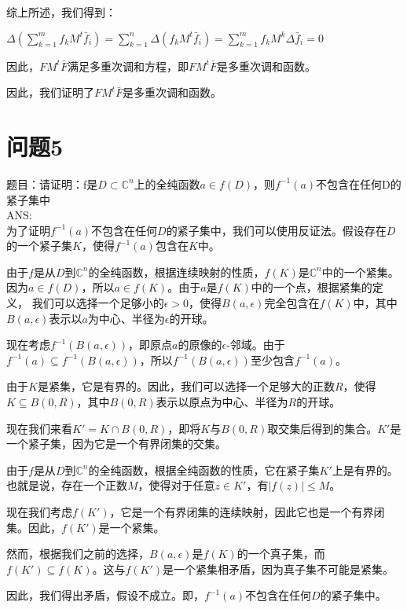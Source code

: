 \documentclass[12pt, a4paper, oneside]{ctexart}
\begin{document}
\begin{spacing}{2.0}
综上所述，我们得到：

\begin{center}
    $\displaystyle \Delta(\sum\limits_{k=1}^{m}f_kM^t\bar{f}_i)=\sum\limits_{k=1}^{n}\Delta(f_kM^t\bar{f}_i)=\sum\limits_{k=1}^{m}f_kM^k\Delta\bar{f}_i=0$
\end{center}

因此，$FM^t\bar{F}$满足多重次调和方程，即$FM^t\bar{F}$是多重次调和函数。

因此，我们证明了$FM^t\bar{F}$是多重次调和函数。


\section{问题5}
题目：请证明：f是$D\subset \mathbb{C} ^n$上的全纯函数$a\in f(D)$，则$f^{-1}(a)$不包含在任何D的紧子集中
\\
ANS:\\
为了证明$f^{-1}(a)$不包含在任何$D$的紧子集中，我们可以使用反证法。假设存在$D$的一个紧子集$K$，使得$f^{-1}(a)$包含在$K$中。

由于$f$是从$D$到$\mathbb{C}^n$的全纯函数，根据连续映射的性质，$f(K)$是$\mathbb{C}^n$中的一个紧集。因为$a\in f(D)$，所以$a\in f(K)$。由于$a$是$f(K)$中的一个点，根据紧集的定义，
我们可以选择一个足够小的$\epsilon>0$，使得$B(a,\epsilon)$完全包含在$f(K)$中，其中$B(a,\epsilon)$表示以$a$为中心、半径为$\epsilon$的开球。

现在考虑$f^{-1}(B(a,\epsilon))$，即原点$a$的原像的$\epsilon$-邻域。由于$\displaystyle f^{-1}(a)\subseteq f^{-1}(B(a,\epsilon))$，所以$f^{-1}(B(a,\epsilon))$至少包含$f^{-1}(a)$。

由于$K$是紧集，它是有界的。因此，我们可以选择一个足够大的正数$R$，使得$K\subseteq B(0,R)$，其中$B(0,R)$表示以原点为中心、半径为$R$的开球。

现在我们来看$K' = K \cap B(0,R)$，即将$K$与$B(0,R)$取交集后得到的集合。$K'$是一个紧子集，因为它是一个有界闭集的交集。

由于$f$是从$D$到$\mathbb{C}^n$的全纯函数，根据全纯函数的性质，它在紧子集$K'$上是有界的。也就是说，存在一个正数$M$，使得对于任意$z\in K'$，有$|f(z)|\leq M$。

现在我们考虑$f(K')$，它是一个有界闭集的连续映射，因此它也是一个有界闭集。因此，$f(K')$是一个紧集。

然而，根据我们之前的选择，$\displaystyle B(a,\epsilon)$是$f(K)$的一个真子集，而$f(K')\subseteq f(K)$。这与$f(K')$是一个紧集相矛盾，因为真子集不可能是紧集。

因此，我们得出矛盾，假设不成立。即，$\displaystyle f^{-1}(a)$不包含在任何$D$的紧子集中。


\end{spacing}
\end{document}
